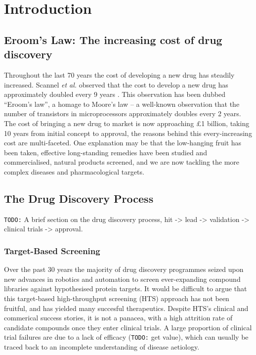\documentclass[a4paper,11pt,twoside,openright]{scrbook}
\begin{document}
\chapter{Introduction} \label{chapter:intro}

\section{Eroom's Law: The increasing cost of drug discovery}
Throughout the last 70 years the cost of developing a new drug has steadily increased.
Scannel \textit{et al.} observed that the cost to develop a new drug has approximately doubled every 9 years \cite{Scannell2012}.
This observation has been dubbed ``Eroom's law'', a homage to Moore's law -- a well-known observation that the number of transistors in microprocessors approximately doubles every 2 years.
The cost of bringing a new drug to market is now approaching £1 billion, taking 10 years from initial concept to approval, the reasons behind this every-increasing cost are multi-faceted.
One explanation may be that the low-hanging fruit has been taken, effective long-standing remedies have been studied and commercialised, natural products screened, and we are now tackling the more complex diseases and pharmacological targets.

\section{The Drug Discovery Process}
\texttt{TODO:} A brief section on the drug discovery process, hit -> lead -> validation -> clinical trials -> approval.

\subsection{Target-Based Screening}
Over the past 30 years the majority of drug discovery programmes seized upon new advances in robotics and automation to screen ever-expanding compound libraries against hypothesised protein targets.
It would be difficult to argue that this target-based high-throughput screening (HTS) approach has not been fruitful, and has yielded many succesful therapeutics.
Despite HTS's clinical and commerical success stories, it is not a panacea, with a high attrition rate of candidate compounds once they enter clinical trials.
A large proportion of clinical trial failures are due to a lack of efficacy (\texttt{TODO:} get value), which can usually be traced back to an incomplete understanding of disease aetiology.
\end{document}
